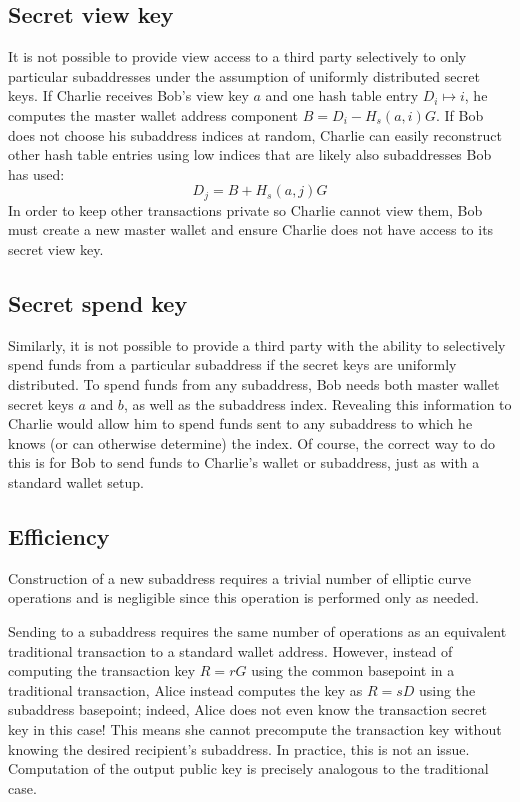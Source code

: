 \documentclass{mrl}
\begin{document}
\subsection{Secret view key}
It is not possible to provide view access to a third party selectively to only particular subaddresses under the assumption of uniformly distributed secret keys. If Charlie receives Bob's view key $a$ and one hash table entry $D_i \mapsto i$, he computes the master wallet address component $B = D_i - H_s(a,i)G$. If Bob does not choose his subaddress indices at random, Charlie can easily reconstruct other hash table entries using low indices that are likely also subaddresses Bob has used:
$$D_j = B + H_s(a,j)G$$
In order to keep other transactions private so Charlie cannot view them, Bob must create a new master wallet and ensure Charlie does not have access to its secret view key.

\subsection{Secret spend key}
Similarly, it is not possible to provide a third party with the ability to selectively spend funds from a particular subaddress if the secret keys are uniformly distributed. To spend funds from any subaddress, Bob needs both master wallet secret keys $a$ and $b$, as well as the subaddress index. Revealing this information to Charlie would allow him to spend funds sent to any subaddress to which he knows (or can otherwise determine) the index. Of course, the correct way to do this is for Bob to send funds to Charlie's wallet or subaddress, just as with a standard wallet setup.

\subsection{Efficiency}
Construction of a new subaddress requires a trivial number of elliptic curve operations and is negligible since this operation is performed only as needed.

Sending to a subaddress requires the same number of operations as an equivalent traditional transaction to a standard wallet address. However, instead of computing the transaction key $R = rG$ using the common basepoint in a traditional transaction, Alice instead computes the key as $R = sD$ using the subaddress basepoint; indeed, Alice does not even know the transaction secret key in this case! This means she cannot precompute the transaction key without knowing the desired recipient's subaddress. In practice, this is not an issue. Computation of the output public key is precisely analogous to the traditional case.
\end{document}
